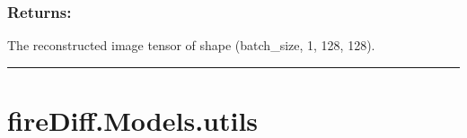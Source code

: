 \documentclass[a4paper,10pt,english]{sphinxmanual}
\begin{document}
\begin{fulllineitems}
\begin{fulllineitems}
\begin{description}
\end{description}


\subsubsection{Returns:}
\label{\detokenize{models:id47}}\begin{description}
\sphinxAtStartPar
The reconstructed image tensor of shape (batch\_size, 1, 128, 128).

\end{description}

\end{fulllineitems}


\end{fulllineitems}



\bigskip\hrule\bigskip



\section{fireDiff.Models.utils}
\label{\detokenize{models:module-fireDiff.Models.utils}}\label{\detokenize{models:firediff-models-utils}}
\end{document}
